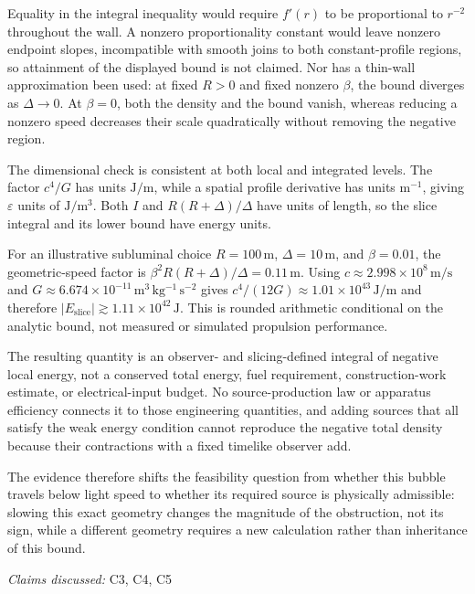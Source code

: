 \documentclass[11pt]{article}
\begin{document}
Equality in the integral inequality would require $f'(r)$ to be proportional to $r^{-2}$ throughout the wall. A nonzero proportionality constant would leave nonzero endpoint slopes, incompatible with smooth joins to both constant-profile regions, so attainment of the displayed bound is not claimed. Nor has a thin-wall approximation been used: at fixed $R>0$ and fixed nonzero $\beta$, the bound diverges as $\Delta\to0$. At $\beta=0$, both the density and the bound vanish, whereas reducing a nonzero speed decreases their scale quadratically without removing the negative region.

The dimensional check is consistent at both local and integrated levels. The factor $c^4/G$ has units $\mathrm{J/m}$, while a spatial profile derivative has units $\mathrm{m}^{-1}$, giving $\varepsilon$ units of $\mathrm{J/m^3}$. Both $I$ and $R(R+\Delta)/\Delta$ have units of length, so the slice integral and its lower bound have energy units.

For an illustrative subluminal choice $R=100\,\mathrm{m}$, $\Delta=10\,\mathrm{m}$, and $\beta=0.01$, the geometric-speed factor is $\beta^2R(R+\Delta)/\Delta=0.11\,\mathrm{m}$. Using $c\approx2.998\times10^8\,\mathrm{m/s}$ and $G\approx6.674\times10^{-11}\,\mathrm{m^3\,kg^{-1}\,s^{-2}}$ gives $c^4/(12G)\approx1.01\times10^{43}\,\mathrm{J/m}$ and therefore $|E_{\mathrm{slice}}|\gtrsim1.11\times10^{42}\,\mathrm{J}$. This is rounded arithmetic conditional on the analytic bound, not measured or simulated propulsion performance.

The resulting quantity is an observer- and slicing-defined integral of negative local energy, not a conserved total energy, fuel requirement, construction-work estimate, or electrical-input budget. No source-production law or apparatus efficiency connects it to those engineering quantities, and adding sources that all satisfy the weak energy condition cannot reproduce the negative total density because their contractions with a fixed timelike observer add.

The evidence therefore shifts the feasibility question from whether this bubble travels below light speed to whether its required source is physically admissible: slowing this exact geometry changes the magnitude of the obstruction, not its sign, while a different geometry requires a new calculation rather than inheritance of this bound.

\textit{Claims discussed: }C3, C4, C5
\end{document}
